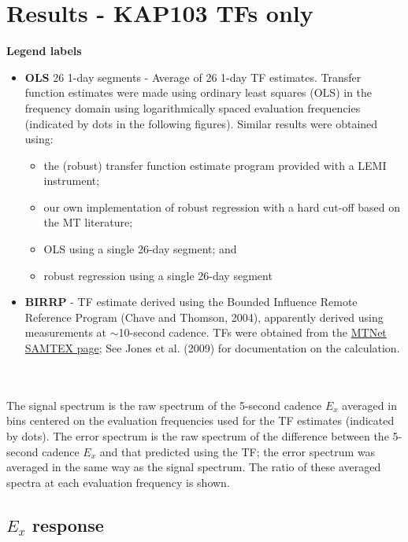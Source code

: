 \documentclass{article}
\begin{document}
\clearpage

\section{Results - KAP103 TFs only}

{\bf Legend labels}

\begin{itemize}
    \item {\bf OLS} 26 1-day segments - Average of 26 1-day TF estimates. Transfer function estimates were made using ordinary least squares (OLS) in the frequency domain using logarithmically spaced evaluation frequencies (indicated by dots in the following figures). Similar results were obtained using:
    \begin{itemize}
        \item the (robust) transfer function estimate program provided with a LEMI instrument;
        \item our own implementation of robust regression with a hard cut-off based on the MT literature;  
        \item OLS using a single 26-day segment; and
        \item robust regression  using a single 26-day segment
    \end{itemize}

    \item {\bf BIRRP} - TF estimate derived using the Bounded Influence Remote Reference Program (Chave and Thomson, 2004), apparently derived using measurements at $\sim$10-second cadence. TFs were obtained from the \href{https://www.mtnet.info/data/samtex/samtex.html}{MTNet SAMTEX page}; See Jones et al. (2009) for documentation on the calculation.
\end{itemize}
\vspace{0.1in}
\\\\
The signal spectrum is the raw spectrum of the 5-second cadence $E_x$ averaged in bins centered on the evaluation frequencies used for the TF estimates (indicated by dots). The error spectrum is the raw spectrum of the difference between the 5-second cadence $E_x$ and that predicted using the TF; the error spectrum was averaged in the same way as the signal spectrum. The ratio of these averaged spectra at each evaluation frequency is shown.


\subsection{$E_x$ response}
\end{document}
